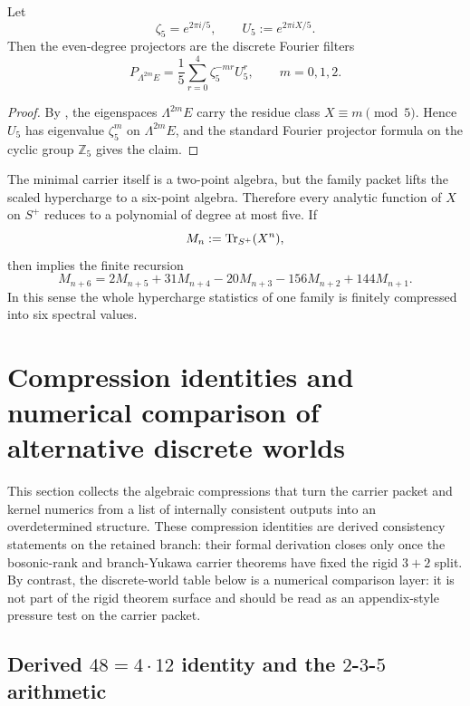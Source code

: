 \begin{corollary}
\label{cor:family-degree-filters}
Let
\[
\zeta_5=e^{2\pi i/5},
\qquad
U_5:=e^{2\pi iX/5}.
\]
Then the even-degree projectors are the discrete Fourier filters
\[
P_{\Lambda^{2m}E}
=
\frac15\sum_{r=0}^{4}\zeta_5^{-mr}U_5^r,
\qquad
m=0,1,2.
\]
\end{corollary}

\begin{proof}
By , the eigenspaces $\Lambda^{2m}E$ carry the residue class $X\equiv m\pmod 5$. Hence $U_5$ has eigenvalue $\zeta_5^m$ on $\Lambda^{2m}E$, and the standard Fourier projector formula on the cyclic group $\mathbb Z_5$ gives the claim.
\end{proof}

\begin{remark}
The minimal carrier itself is a two-point algebra, but the family packet lifts the scaled hypercharge to a six-point algebra. Therefore every analytic function of $X$ on $S^+$ reduces to a polynomial of degree at most five. If
\[
M_n:=\operatorname{Tr}_{S^+}(X^n),
\]
then  implies the finite recursion
\[
M_{n+6}
=
2M_{n+5}+31M_{n+4}-20M_{n+3}-156M_{n+2}+144M_{n+1}.
\]
In this sense the whole hypercharge statistics of one family is finitely compressed into six spectral values.
\end{remark}


\section{Compression identities and numerical comparison of alternative discrete worlds}

This section collects the algebraic compressions that turn the carrier packet and kernel numerics
from a list of internally consistent outputs into an overdetermined structure. These compression
identities are derived consistency statements on the retained branch: their formal derivation closes
only once the bosonic-rank and branch-Yukawa carrier theorems have fixed the rigid $3+2$ split. By
contrast, the discrete-world table below is a numerical comparison layer: it is not part of the
rigid theorem surface and should be read as an appendix-style pressure test on the carrier packet.

\subsection{Derived \texorpdfstring{$48=4\cdot12$}{48=4·12} identity and the \texorpdfstring{$2$-$3$-$5$}{2-3-5} arithmetic}

